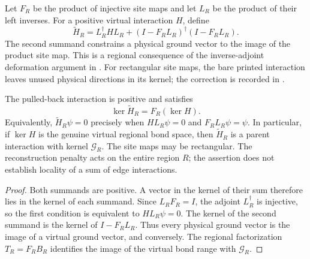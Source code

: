 \begin{definition}%
    \label{def:peps_injective_region_parent_transport}
    \leanok
    Let $F_R$ be the product of injective site maps and let $L_R$ be the
    product of their left inverses. For a positive virtual interaction $H$,
    define
    \[
        \widetilde H_R=L_R^\dagger H L_R
        +(I-F_RL_R)^\dagger(I-F_RL_R).
    \]
    The second summand constrains a physical ground vector to the image
    of the product site map. This is a regional consequence of the
    inverse-adjoint deformation argument in
    \cite[Section IV.C.1]{Cirac2021Matrix}. For rectangular site maps,
    the bare printed interaction leaves unused physical directions in
    its kernel; the correction is recorded in
    \cite{gap:cpgsv21_injective_parent_reconstruction}.
\end{definition}

\begin{lemma}%
    \label{thm:peps_injective_region_parent_transport}
    \leanok
    The pulled-back interaction is positive and satisfies
    \[
        \ker\widetilde H_R=F_R(\ker H).
    \]
    Equivalently, $\widetilde H_R\psi=0$ precisely when
    $HL_R\psi=0$ and $F_RL_R\psi=\psi$.
    In particular, if $\ker H$ is the genuine virtual regional bond
    space, then $\widetilde H_R$ is a parent interaction with kernel
    $\mathcal G_R$. The site maps may be rectangular. The reconstruction
    penalty acts on the entire region $R$; the assertion does not
    establish locality of a sum of edge interactions.
\end{lemma}

\begin{proof}\leanok
    Both summands are positive. A vector in the kernel of their sum
    therefore lies in the kernel of each summand. Since
    $L_RF_R=I$, the adjoint $L_R^\dagger$ is injective, so the first
    condition is equivalent to $HL_R\psi=0$. The kernel of the second
    summand is the kernel of $I-F_RL_R$. Thus every physical ground
    vector is the image of a virtual ground vector, and conversely.
    The regional factorization $T_R=F_RB_R$ identifies the image of the
    virtual bond range with $\mathcal G_R$.
\end{proof}
